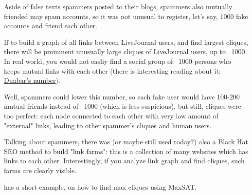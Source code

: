 Aside of false texts spammers posted to their blogs, spammers also mutually friended may spam accounts, so it was not unusual to register, let's say, 1000 fake
accounts and friend each other.

If to build a graph of all links between LiveJournal users, and find largest cliques, there will be prominent unusually large cliques of LiveJournal users, 
up to ~1000.
In real world, you would not easliy find a social group of ~1000 persons who keeps mutual links with each other 
(there is interesting reading about it: \href{https://en.wikipedia.org/w/index.php?title=Dunbar%27s_number}{Dunbar's number}).

Well, spammers could lower this number, so each fake user would have 100-200 mutual friends instead of ~1000 (which is less suspicious), but still, 
cliques were too perfect: each node connected to each other with very low
amount of "external" links, leading to other spammer's cliques and human users.


Talking about spammers, there was (or maybe still used today?) also a Black Hat SEO method to build 
"link farms":
this is a collection of many websites which has links to each other.
Interestingly, if you analyze link graph and find cliques, such farms are clearly visible.


\SSBE has a short example, on how to find max cliques using MaxSAT.

\levelup{}

